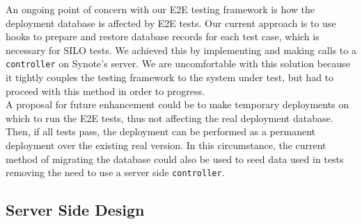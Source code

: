 An ongoing point of concern with our E2E testing framework is how the deployment database is affected by E2E tests. Our current approach is to use hooks to prepare and restore database records for each test case, which is necessary for SILO tests. We achieved this by implementing and making calls to a \texttt{controller} on Synote's server. We are uncomfortable with this solution because it tightly couples the testing framework to the system under test, but had to proceed with this method in order to progress.\\ 

A proposal for future enhancement could be to make temporary deployments on which to run the E2E tests, thus not affecting the real deployment database. Then, if all tests pass, the deployment can be performed as a permanent deployment over the existing real version. In this circumstance, the current method of migrating the database could also be used to seed data used in tests removing the need to use a server side \texttt{controller}.\\  

\subsection{Server Side Design}
\label{subsec:server-side-design}